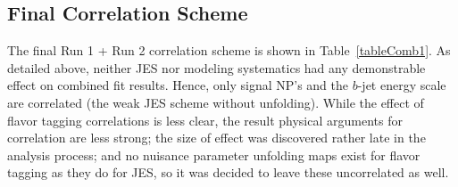 \begin{comment}
\begin{table}[htbp]
\begin{center}
\label{tab:run1+run2SignalSystematicsCorrelationProjections}
\begin{tabular}{lcccc}
\hline\hline
 &$\left|\Delta\mu\right|$ &$\sigma$ &$\left|\Delta\sigma\right|$ &$\chi^2$\\
\hline
$\rho$=-1 & 0.0001 & 0.2565 & 0.00531 (2.03\%) & 1.7436\\
\hline
$\rho$=-0.6 & 0.0001 & 0.2587 & 0.00317 (1.21\%) & 1.7709\\
\hline
$\rho$=-0.3 & 0.0 & 0.2603 & 0.00158 (0.604\%) & 1.792\\
\hline
$\rho$=0 & --- & 0.2618 & --- & 1.8136\\
\hline
$\rho$=0.3 & 0.0 & 0.2634 & 0.00157 (0.6\%) & 1.8357\\
\hline
$\rho$=0.6 & 0.0001 & 0.265 & 0.00313 (1.2\%) & 1.8583\\
\hline
$\rho$=1 & 0.0001 & 0.267 & 0.0052 (1.99\%) & 1.8894\\
\hline
\end{tabular}\caption{run1+run2 Signal Systematics Correlation Projections}
\end{center}\end{table}
\end{comment}


\subsection{Final Correlation Scheme}
The final Run 1 + Run 2 correlation scheme is shown in Table~\ref{tableComb1}.  As detailed above, neither JES nor modeling systematics had any demonstrable effect on combined fit results.  Hence, only signal NP's and the $b$-jet energy scale are correlated (the weak JES scheme without unfolding).  While the effect of flavor tagging correlations is less clear, the result physical arguments for correlation are less strong; the size of effect was discovered rather late in the analysis process; and  no nuisance parameter unfolding maps exist for flavor tagging as they do for JES, so it was decided to leave these uncorrelated as well.

